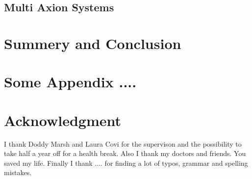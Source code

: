 \documentclass[master,       %
               twoside,        %
               BCOR10mm,       %
               english,ngerman, %
               ]{GAUBM}
\begin{document}
\begin{otherlanguage}{english}
\section{Multi Axion Systems}

\chapter{Summery and Conclusion}


\appendix

\chapter{Some Appendix ....}

\cleardoublepage


\chapter*{Acknowledgment}
I thank Doddy Marsh and Laura Covi for the supervison and the possibility to take half a year off for a health break. Also I thank my doctors and friends. You saved my life. Finally I thank .... for finding a lot of typos, grammar and spelling mistakes.

\end{otherlanguage}
\Declaration
\end{document}
